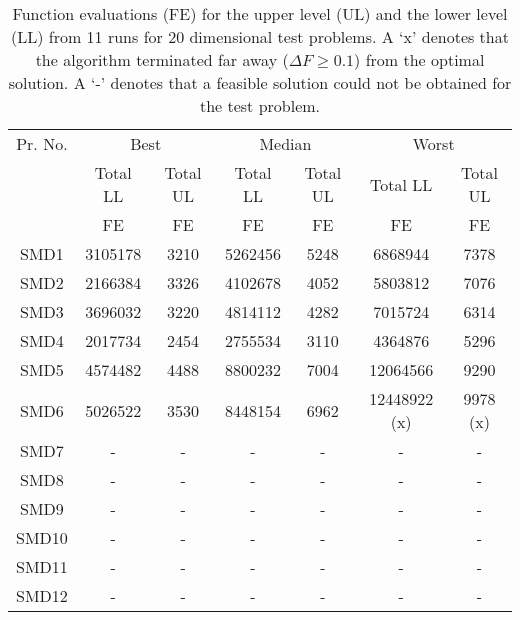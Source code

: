 \documentclass[twoside]{article}
\begin{document}
\begin{table*}[!ht]
\caption{Function evaluations (FE) for the upper level (UL) and the lower level (LL) from 11
  runs for 20 dimensional test problems. A `x' denotes that the algorithm terminated far away ($\Delta F \ge 0.1$) from the optimal solution. A `-' denotes that a feasible solution could not be obtained for the test problem.} 
\label{tab:table3a}
{\small\begin{center}
\begin{tabular}{|c|c|c|c|c|c|c|} \hline
Pr. No.	&	\multicolumn{2}{|c|}{Best}	&	\multicolumn{2}{|c|}{Median}	&	\multicolumn{2}{|c|}{Worst}	\\	\cline{2-7}
	&		\multicolumn{1}{|c|}{Total LL}	&	\multicolumn{1}{|c|}{Total UL}	&	\multicolumn{1}{|c|}{Total LL}	&	\multicolumn{1}{|c|}{Total UL}	&	\multicolumn{1}{|c|}{Total LL}	&\multicolumn{1}{|c|}{Total UL}	\\	
	&	\multicolumn{1}{|c|}{FE} 	&
        \multicolumn{1}{|c|}{FE}	&\multicolumn{1}{|c|}{FE}         &\multicolumn{1}{|c|}{FE}        &
        \multicolumn{1}{|c|}{FE}& \multicolumn{1}{|c|}{FE}	\\ \hline	
SMD1 & 3105178 & 3210 & 5262456 & 5248 & 6868944 & 7378 \\	\hline
SMD2 & 2166384 & 3326 & 4102678 & 4052 & 5803812 & 7076 \\	\hline
SMD3 & 3696032 & 3220 & 4814112 & 4282 & 7015724 & 6314 \\	\hline
SMD4 & 2017734 & 2454 & 2755534 & 3110 & 4364876 & 5296 \\	\hline
SMD5 & 4574482 & 4488 & 8800232 & 7004 & 12064566 & 9290 \\	\hline
SMD6 & 5026522 & 3530 & 8448154 & 6962 & 12448922 (x) & 9978 (x) \\	\hline
SMD7 & - & - & - & - & - & -  \\	\hline
SMD8 & - & - & - & - & - & -  \\	\hline
SMD9 & - & - & - & - & - & -  \\	\hline
SMD10 & - & - & - & - & - & -  \\	\hline
SMD11 & -& -& -& -& -& - \\ \hline
SMD12 & -& -& -& -& -& - \\ \hline
\end{tabular}
\end{center}}
\end{table*}
\end{document}
